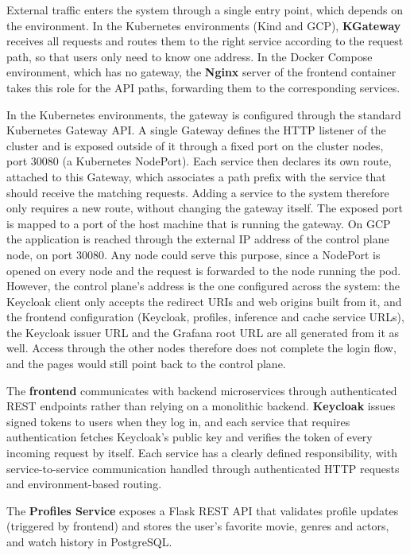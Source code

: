\documentclass[10pt]{llncs}
\begin{document}
External traffic enters the system through a single entry point, which depends on the environment. In the Kubernetes environments (Kind and GCP), \textbf{KGateway} receives all requests and routes them to the right service according to the request path, so that users only need to know one address. In the Docker Compose environment, which has no gateway, the \textbf{Nginx} server of the frontend container takes this role for the API paths, forwarding them to the corresponding services.

In the Kubernetes environments, the gateway is configured through the standard Kubernetes Gateway API. A single Gateway defines the HTTP listener of the cluster and is exposed outside of it through a fixed port on the cluster nodes, port 30080 (a Kubernetes NodePort). Each service then declares its own route, attached to this Gateway, which associates a path prefix with the service that should receive the matching requests. Adding a service to the system therefore only requires a new route, without changing the gateway itself. The exposed port is mapped to a port of the host machine that is running the gateway. On GCP the application is reached through the external IP address of the control plane node, on port 30080. Any node could serve this purpose, since a NodePort is opened on every node and the request is forwarded to the node running the pod. However, the control plane's address is the one configured across the system: the Keycloak client only accepts the redirect URIs and web origins built from it, and the frontend configuration (Keycloak, profiles, inference and cache service URLs), the Keycloak issuer URL and the Grafana root URL are all generated from it as well. Access through the other nodes therefore does not complete the login flow, and the pages would still point back to the control plane.

The \textbf{frontend} communicates with backend microservices through authenticated REST endpoints rather than relying on a monolithic backend. \textbf{Keycloak} issues signed tokens to users when they log in, and each service that requires authentication fetches Keycloak's public key and verifies the token of every incoming request by itself. Each service has a clearly defined responsibility, with service-to-service communication handled through authenticated HTTP requests and environment-based routing.

The \textbf{Profiles Service} exposes a Flask REST API that validates profile updates (triggered by frontend) and stores the user's favorite movie, genres and actors, and watch history in PostgreSQL.
\end{document}

